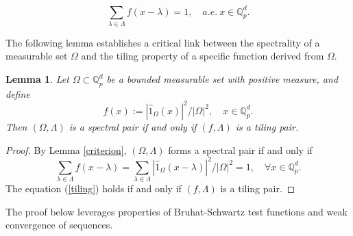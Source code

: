 \documentclass[a4paper,12pt]{amsart}
\newtheorem{lemma}[theorem]{Lemma}
\def\Q{\mathbb{Q}}
\begin{document}
$$
\sum_{\lambda\in\Lambda}f(x-\lambda)=1, \quad a.e. \ x\in \Q_p^d.
$$


The following lemma establishes a critical link between the spectrality of a measurable
set $\Omega$ and the tiling property of a specific function derived from $\Omega$.

\begin{lemma}\label{spectral}
Let $\Omega\subset\Q_p^d$ be a bounded measurable set with positive measure, and define
$$
     f(x):=|\widehat{1}_{\Omega}(x)|^2/|\Omega|^2,\quad x\in \Q_p^d.
$$
Then $(\Omega, \Lambda)$  is a spectral pair if and only if $(f, \Lambda)$  is a tiling pair.
\end{lemma}
\begin{proof}
By Lemma \ref{criterion}, $(\Omega,\Lambda)$ forms a spectral pair if and only if
\begin{equation}\label{tiling}
\sum_{\lambda\in\Lambda}f(x-\lambda)=\sum_{\lambda\in\Lambda}|\widehat{1}_{\Omega}(x-\lambda)|^2/|\Omega|^2=1, \quad \forall x\in\Q_p^d.
\end{equation}
The equation (\ref{tiling}) holds if and only if $(f, \Lambda)$ is a tiling pair.
\end{proof}

The proof below leverages properties of Bruhat-Schwartz test functions and
weak convergence of sequences.
\end{document}
